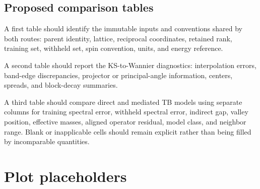 \subsection*{Proposed comparison tables}

A first table should identify the immutable inputs and conventions shared by
both routes: parent identity, lattice, reciprocal coordinates, retained rank,
training set, withheld set, spin convention, units, and energy reference.

A second table should report the KS-to-Wannier diagnostics: interpolation
errors, band-edge discrepancies, projector or principal-angle information,
centers, spreads, and block-decay summaries.

A third table should compare direct and mediated TB models using separate
columns for training spectral error, withheld spectral error, indirect gap,
valley position, effective masses, aligned operator residual, model class, and
neighbor range. Blank or inapplicable cells should remain explicit rather than
being filled by incomparable quantities.

\section*{Plot placeholders}

